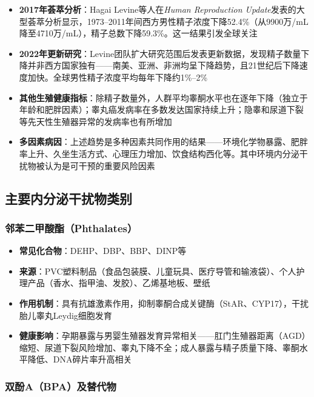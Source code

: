 \begin{itemize}[leftmargin=2cm]
	\item \textbf{2017年荟萃分析}：Hagai Levine等人在\textit{Human Reproduction Update}发表的大型荟萃分析显示，1973--2011年间西方男性精子浓度下降52.4\%（从9900万/mL降至4710万/mL），精子总数下降59.3\%。这一结果引发全球关注
	\item \textbf{2022年更新研究}：Levine团队扩大研究范围后发表更新数据，发现精子数量下降并非西方国家独有——南美、亚洲、非洲均呈下降趋势，且21世纪后下降速度加快。全球男性精子浓度平均每年下降约1\%--2\%
	\item \textbf{其他生殖健康指标}：除精子数量外，人群平均睾酮水平也在逐年下降（独立于年龄和肥胖因素）；睾丸癌发病率在多数发达国家持续上升；隐睾和尿道下裂等先天性生殖器异常的发病率也有所增加
	\item \textbf{多因素病因}：上述趋势是多种因素共同作用的结果——环境化学物暴露、肥胖率上升、久坐生活方式、心理压力增加、饮食结构西化等。其中环境内分泌干扰物被认为是可干预的重要风险因素
\end{itemize}

\subsection{主要内分泌干扰物类别}

\subsubsection{邻苯二甲酸酯（Phthalates）}

\begin{itemize}[leftmargin=2cm]
	\item \textbf{常见化合物}：DEHP、DBP、BBP、DINP等
	\item \textbf{来源}：PVC塑料制品（食品包装膜、儿童玩具、医疗导管和输液袋）、个人护理产品（香水、指甲油、发胶）、乙烯基地板、壁纸
	\item \textbf{作用机制}：具有抗雄激素作用，抑制睾酮合成关键酶（StAR、CYP17），干扰胎儿睾丸Leydig细胞发育
	\item \textbf{健康影响}：孕期暴露与男婴生殖器发育异常相关——肛门生殖器距离（AGD）缩短、尿道下裂风险增加、睾丸下降不全；成人暴露与精子质量下降、睾酮水平降低、DNA碎片率升高相关
\end{itemize}

\subsubsection{双酚A（BPA）及替代物}

